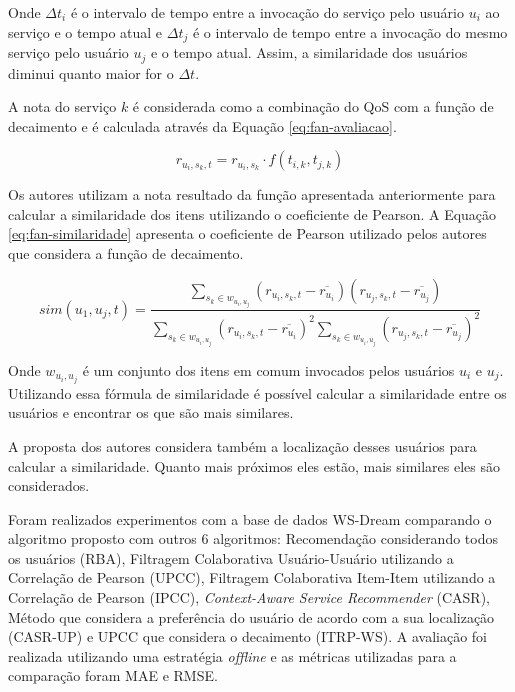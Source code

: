 Onde $\Delta t_i$ é o intervalo de tempo entre a invocação do serviço pelo usuário $u_i$ ao serviço e o tempo atual e
$\Delta t_j$ é o intervalo de tempo entre a invocação do mesmo serviço pelo usuário $u_j$ e o tempo atual. Assim, a
similaridade dos usuários  diminui quanto maior for o $\Delta t$.

A nota do serviço $k$ é considerada como a combinação do QoS com a função de decaimento e é calculada através da Equação \ref{eq:fan-avaliacao}.

\begin{equation}
  \label{eq:fan-avaliacao}
  r_{u_i, s_k, t} = r_{u_i, s_k} \cdot f(t_{i,k}, t_{j,k})
\end{equation}

Os autores utilizam a nota resultado da função apresentada anteriormente para calcular a similaridade dos itens utilizando
o coeficiente de Pearson. A Equação \ref{eq:fan-similaridade} apresenta o coeficiente de Pearson utilizado pelos autores
que considera a função de decaimento.

\begin{equation}
  \label{eq:fan-similaridade}
  sim(u_1, u_j, t) = \frac{\sum_{s_k \in w_{u_i, u_j}}{(r_{u_i, s_k, t} - \overline{r_{u_i}})(r_{u_j, s_k, t} - \overline{r_{u_j}})}}{\sum_{s_k \in w_{u_i, u_j}}{(r_{u_i, s_k, t} - \overline{r_{u_i}})}^2 \sum_{s_k \in w_{u_i, u_j}}{(r_{u_j, s_k, t} - \overline{r_{u_j}})}^2}
\end{equation}

Onde $w_{u_i, u_j}$ é um conjunto dos itens em comum invocados pelos usuários $u_i$ e $u_j$. Utilizando essa fórmula de
similaridade é possível calcular a similaridade entre os usuários e encontrar os que são mais similares.

A proposta dos autores considera também a localização desses usuários para calcular a similaridade. Quanto mais próximos
eles estão, mais similares eles são considerados.

Foram realizados experimentos com a base de dados WS-Dream comparando o algoritmo proposto com outros 6 algoritmos: Recomendação
considerando todos os usuários (RBA), Filtragem Colaborativa Usuário-Usuário utilizando a Correlação de Pearson (UPCC),
Filtragem Colaborativa Item-Item utilizando a Correlação de Pearson (IPCC), \textit{Context-Aware Service Recommender}
(CASR), Método que considera a preferência do usuário de acordo com a sua localização (CASR-UP) e UPCC que considera o
decaimento (ITRP-WS). A avaliação foi realizada utilizando uma estratégia \textit{offline} e as métricas utilizadas para
a comparação foram MAE e RMSE.

